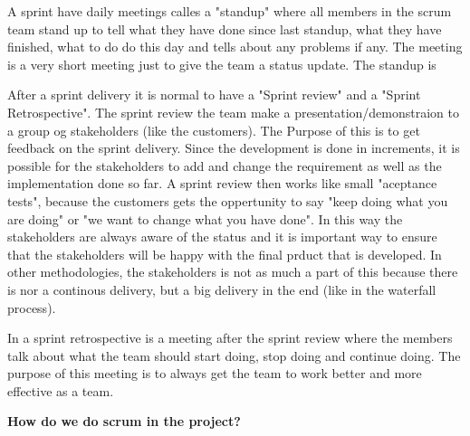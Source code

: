 A sprint have daily meetings calles a "standup" where all members in the scrum team stand up
to tell what they have done since last standup, what they have finished, what to do do this day and
tells about any problems if any. The meeting is a very short meeting just to give the team a status
update. The standup is 

After a sprint delivery it is normal to have a "Sprint review" and a "Sprint Retrospective".
The sprint review the team make a presentation/demonstraion to a group og stakeholders (like the
customers). The Purpose of this is to get feedback on the sprint delivery. Since the development
is done in increments, it is possible for the stakeholders to add and change the requirement as
well as the implementation done so far. A sprint review then works like small "aceptance tests", 
because the customers gets the oppertunity to say "keep doing what you are doing" or "we want to change
what you have done". In this way the stakeholders are always aware of the status and it is important
way to ensure that the stakeholders will be happy with the final prduct that is developed. 
In other methodologies, the stakeholders is not as much a part of this because there is nor a 
continous delivery, but a big delivery in the end (like in the waterfall process).

In a sprint retrospective is a meeting after the sprint review where the members talk about what 
the team should start doing, stop doing and continue doing. The purpose of this meeting is to always 
get the team to work better and more effective as a team.

{\bf How do we do scrum in the project? }


